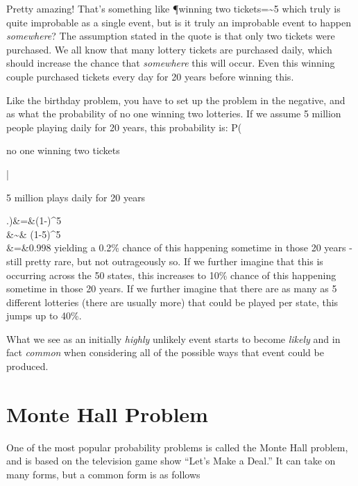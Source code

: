 Pretty amazing!  That's something like
\beq
\P{winning two tickets}=\sim 5
\eeq
which truly is quite improbable as a single event, but is it truly an improbable event to happen \emph{somewhere}?  The assumption stated in the quote is that only two tickets were purchased.  We all know that many lottery tickets are purchased daily, which should increase the chance that \emph{somewhere} this will occur.  Even this winning couple purchased tickets every day for 20 years before winning this.

Like the birthday problem, you have to set up the problem in the negative, and as what the probability of no one winning two lotteries.  If we assume 5 million people playing daily for 20 years, this probability is:
\beq
P\left(\parbox{.7in}{no one winning two tickets}\left|\parbox{.7in}{5 million plays daily for 20 years}\right.\right)&=&\left(1-\right)^{5 }\\
 \nn&\sim& (1-5)^{5 }\\
&=&0.998
\eeq
yielding a 0.2\% chance of this happening sometime in those 20 years - still pretty rare, but not outrageously so.  If we further imagine that this is occurring across the 50 states, this increases to 10\% chance of this happening sometime in those 20 years.  If we further imagine that there are as many as 5 different lotteries (there are usually more) that could be played per state, this jumps up to 40\%.

What we see as an initially \emph{highly} unlikely event starts to become \emph{likely} and in fact \emph{common} when considering all of the possible ways that event could be produced.



\section{Monte Hall Problem}\label{sec:monty}
One of the most popular probability problems is called the Monte Hall problem, and is based on the television game show ``Let's Make a Deal.''\cite{selvin1975problem}  It can take on many forms, but a common form is as follows\cite{vos1990ask}


